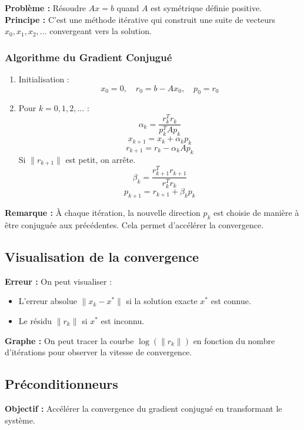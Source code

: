 \documentclass[12pt,a4paper]{article}
\begin{document}
	\textbf{Problème :} Résoudre $Ax = b$ quand $A$ est symétrique définie positive.
	\\ 
	\textbf{Principe :} C’est une méthode itérative qui construit une suite de vecteurs $x_0, x_1, x_2, \dots$ convergeant vers la solution.
	\newpage
	\subsubsection*{Algorithme du Gradient Conjugué}
	
	\begin{enumerate}
		\item Initialisation :
		\[
		x_0 = 0,\quad r_0 = b - Ax_0,\quad p_0 = r_0
		\]
		
		\item Pour $k = 0, 1, 2, \dots$ :
		\[
		\alpha_k = \frac{r_k^T r_k}{p_k^T A p_k}
		\]
		\[
		x_{k+1} = x_k + \alpha_k p_k
		\]
		\[
		r_{k+1} = r_k - \alpha_k A p_k
		\]
		Si $\|r_{k+1}\|$ est petit, on arrête.
		\[
		\beta_k = \frac{r_{k+1}^T r_{k+1}}{r_k^T r_k}
		\]
		\[
		p_{k+1} = r_{k+1} + \beta_k p_k
		\]
	\end{enumerate}
	
	\textbf{Remarque :} À chaque itération, la nouvelle direction $p_k$ est choisie de manière à être conjuguée aux précédentes. Cela permet d’accélérer la convergence.
	
	\subsection{ Visualisation de la convergence}
	
	\textbf{Erreur :} On peut visualiser :
	
	\begin{itemize}
		\item L’erreur absolue $\|x_k - x^*\|$ si la solution exacte $x^*$ est connue.
		\item Le résidu $\|r_k\|$ si $x^*$ est inconnu.
	\end{itemize}
	
	\textbf{Graphe :} On peut tracer la courbe $\log(\|r_k\|)$ en fonction du nombre d’itérations pour observer la vitesse de convergence.
	
	\subsection{ Préconditionneurs}
	
	\textbf{Objectif :} Accélérer la convergence du gradient conjugué en transformant le système.
	
\end{document}
